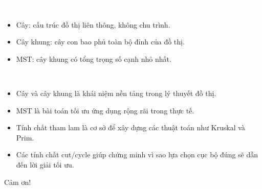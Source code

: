 \documentclass{beamer}
\newcommand{\hlgreen}[1]{\textcolor{mygreen}{#1}}
\newcommand{\hlorange}[1]{\textcolor{myorange}{#1}}
\newcommand{\hlwhite}[1]{\textcolor{white}{#1}}
\begin{document}

\begin{frame}{\hlwhite{So sánh ngắn}}
\begin{tcolorbox}
\begin{itemize}
  \item \hlgreen{Cây}: cấu trúc đồ thị liên thông, không chu trình.
  \item \hlgreen{Cây khung}: cây con bao phủ toàn bộ đỉnh của đồ thị.
  \item \hlgreen{MST}: cây khung có tổng trọng số cạnh nhỏ nhất.
  \end{itemize}
\end{tcolorbox}
\end{frame}


\begin{frame}{\hlwhite{Kết luận}}
\begin{itemize}
  \item Cây và cây khung là khái niệm nền tảng trong lý thuyết đồ thị.
  \item MST là bài toán tối ưu ứng dụng rộng rãi trong thực tế.
  \item Tính chất tham lam là cơ sở để xây dựng các thuật toán như Kruskal và Prim.
  \item Các tính chất cut/cycle giúp chứng minh vì sao lựa chọn cục bộ đúng sẽ dẫn đến lời giải tối ưu.
\end{itemize}

\centerline{\hlorange{Cảm ơn!}}
\end{frame}
\end{document}

